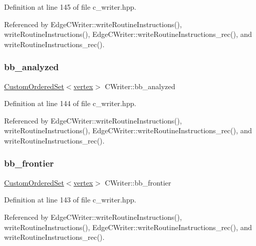 Definition at line 145 of file c\+\_\+writer.\+hpp.



Referenced by Edge\+C\+Writer\+::write\+Routine\+Instructions(), write\+Routine\+Instructions(), Edge\+C\+Writer\+::write\+Routine\+Instructions\+\_\+rec(), and write\+Routine\+Instructions\+\_\+rec().

\mbox{\label{classCWriter_abd6b484e10e87323f731f5754d92164a}} 
\subsubsection{\texorpdfstring{bb\+\_\+analyzed}{bb\_analyzed}}
{\footnotesize\ttfamily \hyperlink{classCustomOrderedSet}{Custom\+Ordered\+Set}$<$\hyperlink{graph_8hpp_abefdcf0544e601805af44eca032cca14}{vertex}$>$ C\+Writer\+::bb\+\_\+analyzed\hspace{0.3cm}{\ttfamily [protected]}}



Definition at line 144 of file c\+\_\+writer.\+hpp.



Referenced by Edge\+C\+Writer\+::write\+Routine\+Instructions(), write\+Routine\+Instructions(), Edge\+C\+Writer\+::write\+Routine\+Instructions\+\_\+rec(), and write\+Routine\+Instructions\+\_\+rec().

\mbox{\label{classCWriter_a3c4baa49dedd4b1a28fbd07e4f4964de}} 
\subsubsection{\texorpdfstring{bb\+\_\+frontier}{bb\_frontier}}
{\footnotesize\ttfamily \hyperlink{classCustomOrderedSet}{Custom\+Ordered\+Set}$<$\hyperlink{graph_8hpp_abefdcf0544e601805af44eca032cca14}{vertex}$>$ C\+Writer\+::bb\+\_\+frontier\hspace{0.3cm}{\ttfamily [protected]}}



Definition at line 143 of file c\+\_\+writer.\+hpp.



Referenced by Edge\+C\+Writer\+::write\+Routine\+Instructions(), write\+Routine\+Instructions(), Edge\+C\+Writer\+::write\+Routine\+Instructions\+\_\+rec(), and write\+Routine\+Instructions\+\_\+rec().

